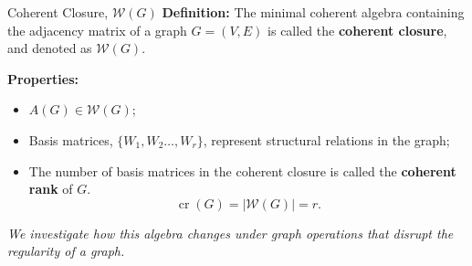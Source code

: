 \documentclass{beamer}
\begin{document}
\begin{frame}{Coherent Closure, \texorpdfstring{$\mathcal{W}(G)$}{W(G)}}
    \textbf{Definition:} The minimal coherent algebra containing the adjacency matrix of a graph $G=(V,E)$ is called the \textbf{coherent closure}, and denoted as $\mathcal{W}(G)$.
    
    \vspace{1em}
    \textbf{Properties:}
    \begin{itemize}
        \item $A(G)\in\mathcal{W}(G)$;
        \item Basis matrices, $\{W_1,W_2\dots,W_r\}$, represent structural relations in the graph;
        \item The number of basis matrices in the coherent closure is called the \textbf{coherent rank} of $G$. 
        \begin{equation*}
            \operatorname{cr}(G) = |\mathcal{W}(G)| = r.
        \end{equation*}
    \end{itemize}
    
    \vspace{0.8em}
    \textit{We investigate how this algebra changes under graph operations that disrupt the regularity of a graph.}
\end{frame}
\end{document}
